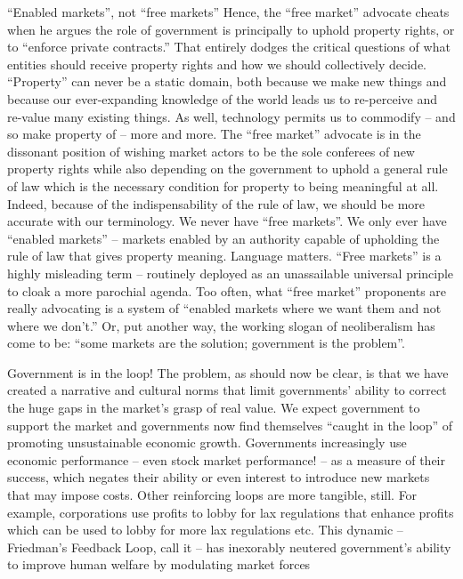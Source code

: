 \documentclass[
]{book}
\begin{document}
``Enabled markets'', not ``free markets''
Hence, the ``free market'' advocate cheats when he argues the role of government is
principally to uphold property rights, or to ``enforce private contracts.'' That entirely dodges the
critical questions of what entities should receive property rights and how we should
collectively decide. ``Property'' can never be a static domain, both because we make new
things and because our ever-expanding knowledge of the world leads us to re-perceive and
re-value many existing things. As well, technology permits us to commodify -- and so make
property of -- more and more.
The ``free market'' advocate is in the dissonant position of wishing market actors to be the sole
conferees of new property rights while also depending on the government to uphold a general
rule of law which is the necessary condition for property to being meaningful at all. Indeed,
because of the indispensability of the rule of law, we should be more accurate with our
terminology. We never have ``free markets''. We only ever have ``enabled markets'' -- markets
enabled by an authority capable of upholding the rule of law that gives property meaning.
Language matters. ``Free markets'' is a highly misleading term -- routinely deployed as an
unassailable universal principle to cloak a more parochial agenda. Too often, what ``free
market'' proponents are really advocating is a system of ``enabled markets where we want
them and not where we don't.'' Or, put another way, the working slogan of neoliberalism has
come to be: ``some markets are the solution; government is the problem''.

Government is in the loop!
The problem, as should now be clear, is that we have created a narrative and cultural norms
that limit governments' ability to correct the huge gaps in the market's grasp of real value. We
expect government to support the market and governments now find themselves ``caught in
the loop'' of promoting unsustainable economic growth.
Governments increasingly use economic performance -- even stock market performance! -- as
a measure of their success, which negates their ability or even interest to introduce new
markets that may impose costs. Other reinforcing loops are more tangible, still. For example,
corporations use profits to lobby for lax regulations that enhance profits which can be used to
lobby for more lax regulations etc. This dynamic -- Friedman's Feedback Loop, call it -- has
inexorably neutered government's ability to improve human welfare by modulating market
forces
\end{document}
